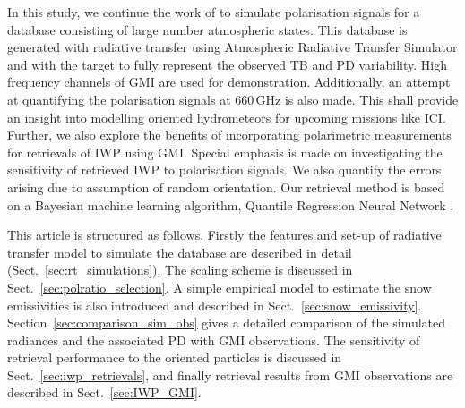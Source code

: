 \documentclass[amt, manuscript]{copernicus}
\begin{document}
In this study, we continue the work of \citet{barlakas:intro:21} to simulate polarisation signals for a database consisting of large number atmospheric states. This database is generated with radiative transfer using Atmospheric Radiative Transfer Simulator \citep[ARTS,][]{eriksson:arts2:11} and with the target to fully represent the observed TB and PD variability. High frequency channels of GMI are used for demonstration. Additionally, an attempt at quantifying the polarisation signals at 660\,GHz is also made. This shall provide an insight into modelling oriented hydrometeors for upcoming missions like ICI. Further, we also explore the benefits of incorporating polarimetric measurements for retrievals of IWP using GMI. Special emphasis is made on investigating the sensitivity of retrieved IWP to polarisation signals. We also quantify the errors arising due to assumption of random orientation. Our retrieval method is based on a Bayesian machine learning algorithm, Quantile Regression Neural Network  \citep[QRNN][]{pfreundschuh:aneur:18}. 

This article is structured as follows. Firstly the features and set-up of radiative transfer model to simulate the database are described in detail (Sect.~\ref{sec:rt_simulations}). The scaling scheme is discussed in Sect.~\ref{sec:polratio_selection}. A simple empirical model to estimate the snow emissivities is also introduced and described in Sect.~\ref{sec:snow_emissivity}. Section~\ref{sec:comparison_sim_obs} gives a detailed comparison of the simulated radiances and the associated PD with GMI observations. The sensitivity of retrieval performance to the oriented particles is discussed in Sect.~\ref{sec:iwp_retrievals}, and finally retrieval results from GMI observations are described in Sect.~\ref{sec:IWP_GMI}.

 
	
 





 
\end{document}
